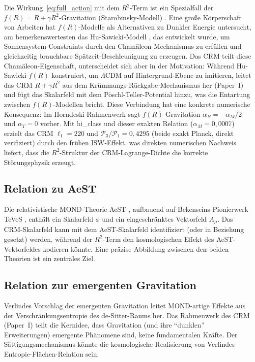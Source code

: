 \documentclass[11pt,a4paper]{article}
\begin{document}
Die Wirkung~\eqref{eq:full_action} mit dem $R^2$-Term ist ein Spezialfall der $f(R) = R + \gamma R^2$-Gravitation (Starobinsky-Modell) \cite{Starobinsky1980}. Eine gro\ss e K\"orperschaft von Arbeiten hat $f(R)$-Modelle als Alternativen zu Dunkler Energie untersucht, am bemerkenswertesten das Hu-Sawicki-Modell \cite{HuSawicki2007}, das entwickelt wurde, um Sonnensystem-Constraints durch den Cham\"aleon-Mechanismus zu erf\"ullen und gleichzeitig brauchbare Sp\"atzeit-Beschleunigung zu erzeugen. Das CRM teilt diese Cham\"aleon-Eigenschaft, unterscheidet sich aber in der Motivation: W\"ahrend Hu-Sawicki $f(R)$ konstruiert, um $\Lambda$CDM auf Hintergrund-Ebene zu imitieren, leitet das CRM $R + \gamma R^2$ aus dem Kr\"ummungs-R\"uckgabe-Mechanismus her (Paper~I) und f\"ugt das Skalarfeld mit dem P\"oschl-Teller-Potential hinzu, was die Entartung zwischen $f(R)$-Modellen bricht. Diese Verbindung hat eine konkrete numerische Konsequenz: Im Horndeski-Rahmenwerk sagt $f(R)$-Gravitation $\alpha_B = -\alpha_M/2$ und $\alpha_T = 0$ vorher. Mit hi\_class \cite{Zumalacarregui2017} und dieser exakten Relation ($\alpha_M = 0{,}0007$) erzielt das CRM $\ell_1 = 220$ und $\mathcal{P}_3/\mathcal{P}_1 = 0{,}4295$ (beide exakt Planck, direkt verifiziert) durch den fr\"uhen ISW-Effekt, was direkten numerischen Nachweis liefert, dass die $R^2$-Struktur der CRM-Lagrange-Dichte die korrekte St\"orungsphysik erzeugt.

\subsection{Relation zu AeST}

Die relativistische MOND-Theorie AeST \cite{Skordis2021}, aufbauend auf Bekenseins Pionierwerk TeVeS \cite{Bekenstein2004}, enth\"alt ein Skalarfeld $\phi$ und ein eingeschr\"anktes Vektorfeld $A_\mu$. Das CRM-Skalarfeld kann mit dem AeST-Skalarfeld identifiziert (oder in Beziehung gesetzt) werden, w\"ahrend der $R^2$-Term den kosmologischen Effekt des AeST-Vektorfeldes kodieren k\"onnte. Eine pr\"azise Abbildung zwischen den beiden Theorien ist ein zentrales Ziel.

\subsection{Relation zur emergenten Gravitation}

Verlindes Vorschlag der emergenten Gravitation \cite{Verlinde2017} leitet MOND-artige Effekte aus der Verschr\"ankungsentropie des de-Sitter-Raums her. Das Rahmenwerk des CRM (Paper~I) teilt die Kernidee, dass Gravitation (und ihre "`dunklen"' Erweiterungen) emergente Ph\"anomene sind, keine fundamentalen Kr\"afte. Der S\"attigungsmechanismus k\"onnte die kosmologische Realisierung von Verlindes Entropie-Fl\"achen-Relation sein.
\end{document}

